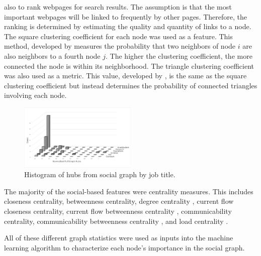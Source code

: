 \documentclass{article}
\begin{document}
\newline \cite{page_pagerank_1999} also to rank webpages for search results.  The assumption is that the most important webpages will be linked to frequently by other pages.  Therefore, the ranking is determined by estimating the quality and quantity of links to a node.  The square clustering coefficient for each node was used as a feature.  This method, developed by \cite{lind_cycles_2005} measures the probability that two neighbors of node $i$ are also neighbors to a fourth node $j$.  The higher the clustering coefficient, the more connected the node is within its neighborhood.  The triangle clustering coefficient was also used as a metric.  This value, developed by \cite{saramaki_generalizations_2007}, is the same as the square clustering coefficient but instead determines the probability of connected triangles involving each node.

\begin{figure}[H]
    \centering
        \includegraphics[width=0.5\textwidth]{Hubs_hist}
        \caption{Histogram of hubs from social graph by job title.}
        \label{fig:social_ex_hist}
\end{figure}

The majority of the social-based features were centrality measures.  This includes closeness centrality, betweenness centrality, degree centrality \cite{borgatti2011analyzing}, current flow closeness centrality, current flow betweenness centrality \cite{brandes2005centrality}, communicability centrality, communicability betweenness centrality \cite{estrada2008communicability}, and load centrality \cite{newman2001scientific}.
\par
All of these different graph statistics were used as inputs into the machine learning algorithm to characterize each node's importance in the social graph.
\end{document}
